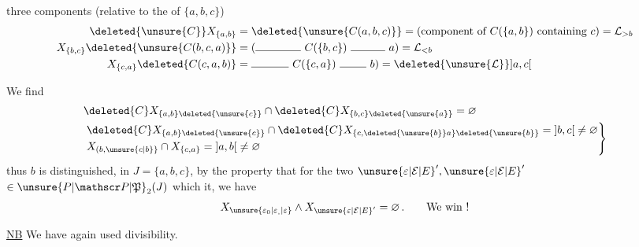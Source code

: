 three components (relative to the  of $\{a,b,c\}$)
\[
\begin{aligned}
\deleted{\unsure{C}}X_{\{a,b\}}&=\deleted{\unsure{C(a,b,c)}}=(\text{component of }C(\{a,b\})\text{ containing }c)=\mathcal L_{>b}\\
X_{\{b,c\}}\deleted{\unsure{C(b,c,a)}}&=(\rule{1.45cm}{.4pt}\ C(\{b,c\})\ \rule{1.1cm}{.4pt}\ a)=\mathcal L_{<b}\\
X_{\{c,a\}}\deleted{C(c,a,b)}&=\rule{1.2cm}{.4pt}\ C(\{c,a\})\ \rule{.85cm}{.4pt}\ b)=\deleted{\unsure{\mathcal L}}\mathopen{]}a,c\mathclose{[}
\end{aligned}
\]

We find
\[
\begin{aligned}
&\deleted{C}X_{\{a,b\}\deleted{\unsure{c}}}\cap\deleted{C}X_{\{b,c\}\deleted{\unsure{a}}}=\varnothing\\
&\left.\begin{aligned}
&\deleted{C}X_{\{a,b\}\deleted{\unsure{c}}}\cap\deleted{C}X_{\{c,\deleted{\unsure{b}}a\}\deleted{\unsure{b}}}=\mathopen{]}b,c\mathclose{[}\ne\varnothing\\
&X_{(b,\unsure{c|b}\}}\cap X_{\{c,a\}}=\mathopen{]}a,b\mathclose{[}\ne\varnothing
\end{aligned}\right\}
\end{aligned}
\]
thus $b$ is distinguished, in $J=\{a,b,c\}$, by the property that for the two  ${\unsure{\varepsilon|\mathcal E|E}}',\unsure{\varepsilon|\mathcal E|E}'$  $\in\unsure{P|\mathscr P|\mathfrak P}_2(J)$ which  it, we have
\[
 X_{\unsure{\varepsilon_{0}|\varepsilon_{,}|\varepsilon}}\wedge X_{\unsure{\varepsilon|\mathcal E|E}'}=\varnothing\,.\qquad\text{We win !}
\]

\uline{NB} We have again used divisibility.


